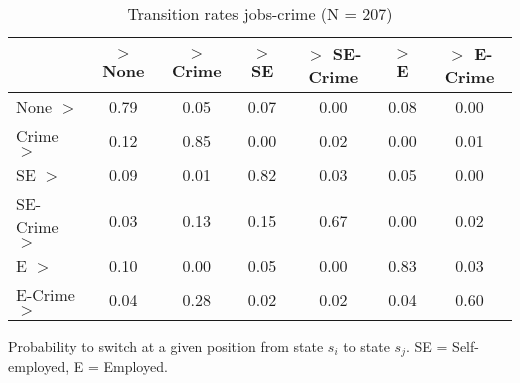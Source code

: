 \begin{table}[htp]
\footnotesize
\setlength{\tabcolsep}{10pt}
\renewcommand{\arraystretch}{1.3}
\begin{threeparttable}
\centering
\caption{Transition rates jobs-crime (N = 207)} 
\label{tab:transition_rates_jobs_crime}
\begin{tabular}{lcccccc}
  \hline
 & $>$ None & $>$ Crime & $>$ SE & $>$ SE-Crime & $>$ E & $>$ E-Crime \\ 
  \hline
None $>$ & 0.79 & 0.05 & 0.07 & 0.00 & 0.08 & 0.00 \\ 
  Crime $>$ & 0.12 & 0.85 & 0.00 & 0.02 & 0.00 & 0.01 \\ 
  SE $>$ & 0.09 & 0.01 & 0.82 & 0.03 & 0.05 & 0.00 \\ 
  SE-Crime $>$ & 0.03 & 0.13 & 0.15 & 0.67 & 0.00 & 0.02 \\ 
  E $>$ & 0.10 & 0.00 & 0.05 & 0.00 & 0.83 & 0.03 \\ 
  E-Crime $>$ & 0.04 & 0.28 & 0.02 & 0.02 & 0.04 & 0.60 \\ 
   \hline
\end{tabular}
\begin{tablenotes}
\scriptsize
\item Probability to switch at a given position from state $s_i$ to state $s_j$. SE = Self-employed, E = Employed.
\end{tablenotes}
\end{threeparttable}
\end{table}
